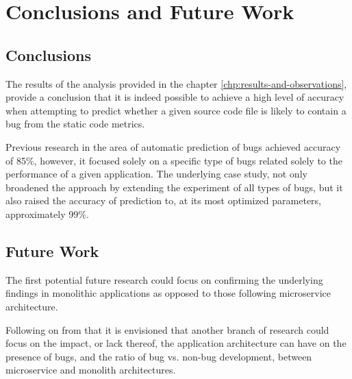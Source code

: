 \chapter{Conclusions and Future Work}\label{chp:conclusions-and-future-work}
\section{Conclusions}\label{sec:conlclusions}
The results of the analysis provided in the chapter \ref{chp:results-and-observations}, provide a conclusion that it is indeed possible to achieve a high level of accuracy when attempting to predict whether a given source code file is likely to contain a bug from the static code metrics. 

Previous research in the area of automatic prediction of bugs \cite{autoDetectionOfPerfBugs} achieved accuracy of 85\%, however, it focused solely on a specific type of bugs related solely to the performance of a given application.
The underlying case study, not only broadened the approach by extending the experiment of all types of bugs, but it also raised the accuracy of prediction to, at its most optimized parameters, approximately 99\%.

\section{Future Work}\label{sec:future-work}
The first potential future research could focus on confirming the underlying findings in monolithic applications as opposed to those following microservice architecture.

Following on from that it is envisioned that another branch of research could focus on the impact, or lack thereof, the application architecture can have on the presence of bugs, and the ratio of bug vs. non-bug development, between microservice and monolith architectures.
